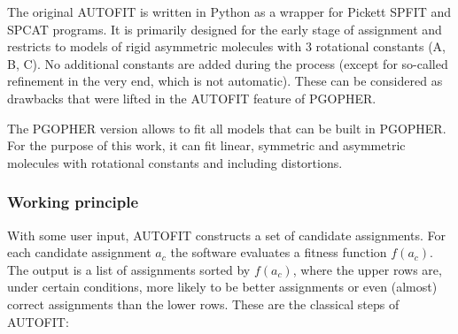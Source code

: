 \documentclass[11pt]{article}
\begin{document}
The original AUTOFIT is written in Python as a wrapper for Pickett SPFIT and SPCAT programs. It is primarily designed for the early stage of assignment and restricts to models of rigid asymmetric molecules with 3 rotational constants (A, B, C).  No additional constants are added during the process (except for so-called refinement in the very end, which is not automatic). These can be considered as drawbacks that were lifted in the AUTOFIT feature of PGOPHER. 

The PGOPHER version allows to fit all models that can be built in PGOPHER. For the purpose of this work, it can fit linear, symmetric and asymmetric molecules with rotational constants and including distortions.

\subsubsection{Working principle}

With some user input, AUTOFIT constructs a set of candidate assignments. For each candidate assignment $a_c$ the software evaluates a fitness function $f(a_c)$. The output is a list of assignments sorted by $f(a_c)$, where the upper rows are, under certain conditions, more likely to be better assignments or even (almost) correct assignments than the lower rows. These are the classical steps of AUTOFIT:
\end{document}
